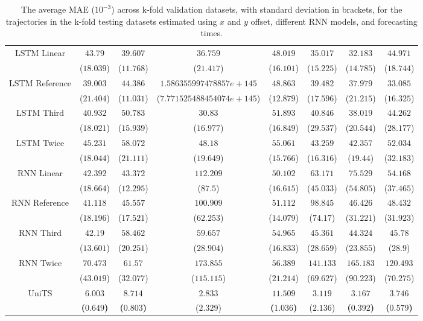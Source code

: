\begin{table}[!ht]
{\begin{tabular}{|c|c|c|c|c|c|c|c|}
			\multirow{2}{*}{LSTM Linear} & $43.79$ & $39.607$ & $36.759$ & $48.019$ & $35.017$ & $32.183$ & $44.971$ \\
			 & ($18.039$) & ($11.768$) & ($21.417$) & ($16.101$) & ($15.225$) & ($14.785$) & ($18.744$) \\ \hline
			\multirow{2}{*}{LSTM Reference} & $39.003$ & $44.386$ & $1.586355997478857e+145$ & $48.863$ & $39.482$ & $37.979$ & $33.085$ \\
			 & ($21.404$) & ($11.031$) & ($7.771525488454074e+145$) & ($12.879$) & ($17.596$) & ($21.215$) & ($16.325$) \\ \hline
			\multirow{2}{*}{LSTM Third} & $40.932$ & $50.783$ & $30.83$ & $51.893$ & $40.846$ & $38.019$ & $44.262$ \\
			 & ($18.021$) & ($15.939$) & ($16.977$) & ($16.849$) & ($29.537$) & ($20.544$) & ($28.177$) \\ \hline
			\multirow{2}{*}{LSTM Twice} & $45.231$ & $58.072$ & $48.18$ & $55.061$ & $43.259$ & $42.357$ & $52.034$ \\
			 & ($18.044$) & ($21.111$) & ($19.649$) & ($15.766$) & ($16.316$) & ($19.44$) & ($32.183$) \\ \hline
			\multirow{2}{*}{RNN Linear} & $42.392$ & $43.372$ & $112.209$ & $50.102$ & $63.171$ & $75.529$ & $54.168$ \\
			 & ($18.664$) & ($12.295$) & ($87.5$) & ($16.615$) & ($45.033$) & ($54.805$) & ($37.465$) \\ \hline
			\multirow{2}{*}{RNN Reference} & $41.118$ & $45.557$ & $100.909$ & $51.112$ & $98.845$ & $46.426$ & $48.432$ \\
			 & ($18.196$) & ($17.521$) & ($62.253$) & ($14.079$) & ($74.17$) & ($31.221$) & ($31.923$) \\ \hline
			\multirow{2}{*}{RNN Third} & $42.19$ & $58.462$ & $59.657$ & $54.965$ & $45.361$ & $44.324$ & $45.78$ \\
			 & ($13.601$) & ($20.251$) & ($28.904$) & ($16.833$) & ($28.659$) & ($23.855$) & ($28.9$) \\ \hline
			\multirow{2}{*}{RNN Twice} & $70.473$ & $61.57$ & $173.855$ & $56.389$ & $141.133$ & $165.183$ & $120.493$ \\
			 & ($43.019$) & ($32.077$) & ($115.115$) & ($21.214$) & ($69.627$) & ($90.223$) & ($70.275$) \\ \hline
			\multirow{2}{*}{UniTS} & $\mathbf{6.003}$ & $\mathbf{8.714}$ & $2.833$ & $\mathbf{11.509}$ & $3.119$ & $\mathbf{3.167}$ & $\mathbf{3.746}$ \\
			 & \textbf{(}$\mathbf{0.649}$\textbf{)} & \textbf{(}$\mathbf{0.803}$\textbf{)} & ($2.329$) & \textbf{(}$\mathbf{1.036}$\textbf{)} & ($2.136$) & \textbf{(}$\mathbf{0.392}$\textbf{)} & \textbf{(}$\mathbf{0.579}$\textbf{)} \\ \hline
		\end{tabular}
	}
	\caption{The average MAE ($10^{-3}$) across k-fold validation datasets, with standard deviation in brackets, for the trajectories in the k-fold testing datasets estimated using $x$ and $y$ offset, different RNN models, and forecasting times.}
	\label{tab:all_no_abs_MAE}
\end{table}

